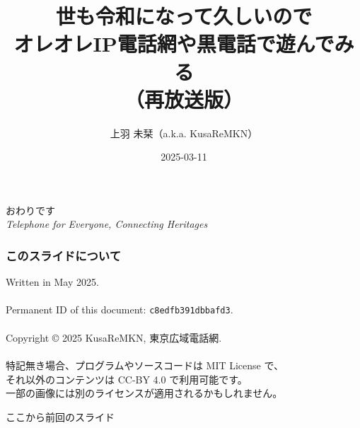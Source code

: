 \documentclass[
  lualatex,
  aspectratio=169,
  14pt
]{beamer}
\begin{document}
\begin{frame}[standout]
  おわりです\\[3\baselineskip]
  {\small\mdseries \textit{Telephone for Everyone, Connecting Heritages}}
  \\[-4\baselineskip]
\end{frame}

\begin{frame}
  \frametitle{このスライドについて}

  Written in May 2025.
  \\~\\[-.5\baselineskip]

  Permanent ID of this document: \texttt{c8edfb391dbbafd3}.
  \\~\\[-.5\baselineskip]

  Copyright © 2025 KusaReMKN, 東京広域電話網.
  \\~\\[-.5\baselineskip]

  特記無き場合、プログラムやソースコードは MIT License で、\\
  \hspace{1.5\zw}それ以外のコンテンツは CC-BY 4.0 で利用可能です。\\
  \hspace{1.5\zw}一部の画像には別のライセンスが適用されるかもしれません。
\end{frame}



\appendix

\begin{frame}[standout]
  ここから前回のスライド
  \note{ }
\end{frame}

\title{世も令和になって久しいので\\オレオレIP電話網や黒電話で遊んでみる\\（再放送版）}
\subject{CS集会\#47}
\author{上羽 未栞（a.k.a. KusaReMKN）}
\date{2025-03-11}

\begin{frame}
  \titlepage
\end{frame}
\end{document}
